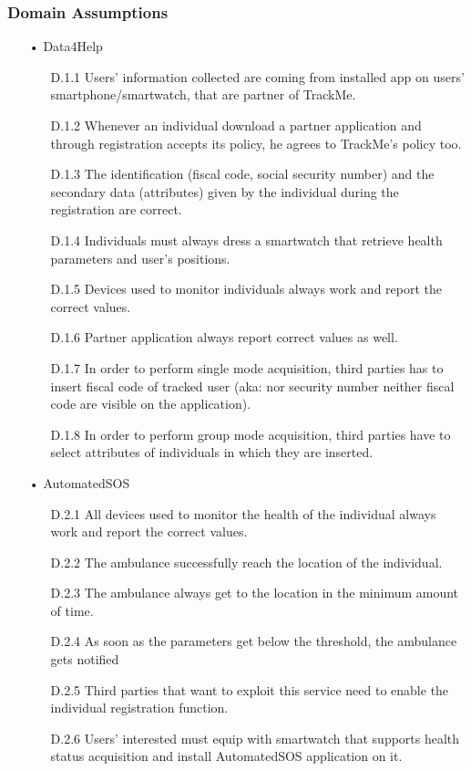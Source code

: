 \subsubsection{Domain Assumptions}
\begin{enumerate}

\item[•] {\Large Data4Help}
	\begin{enumerate}
	\item [D.1.1] Users' information collected are coming from installed app on users' smartphone/smartwatch, that are partner of TrackMe.
	\item [D.1.2] Whenever an individual download a partner application and through registration accepts its policy, he agrees to TrackMe's policy too.
	\item [D.1.3] The identification (fiscal code, social security number) and the secondary data (attributes) given by the individual during the registration are correct.
    \item [D.1.4] Individuals must always dress a smartwatch that retrieve health parameters and user's positions.
    \item [D.1.5] Devices used to monitor individuals always work and report the correct values.
    \item [D.1.6] Partner application always report correct values as well.
	\item [D.1.7] In order to perform single mode acquisition, third parties has to insert fiscal code of tracked user (aka: nor security number neither fiscal code are visible on the application).
	\item [D.1.8] In order to perform group mode acquisition, third parties have to select attributes of individuals in which they are inserted.
	\end{enumerate}
	
\item[•] {\Large AutomatedSOS}
	\begin{enumerate}
	\item [D.2.1] All devices used to monitor the health of the individual always work and report the correct values.
    \item [D.2.2] The ambulance successfully reach the location of the individual.
    \item [D.2.3] The ambulance always get to the location in the minimum amount of time.
    \item [D.2.4] As soon as the parameters get below the threshold, the ambulance gets notified
    \item [D.2.5] Third parties that want to exploit this service need to enable the individual registration function.
    \item [D.2.6] Users' interested must equip with smartwatch that supports health status acquisition and install AutomatedSOS application on it.
	\end{enumerate}
	

\end{enumerate}
